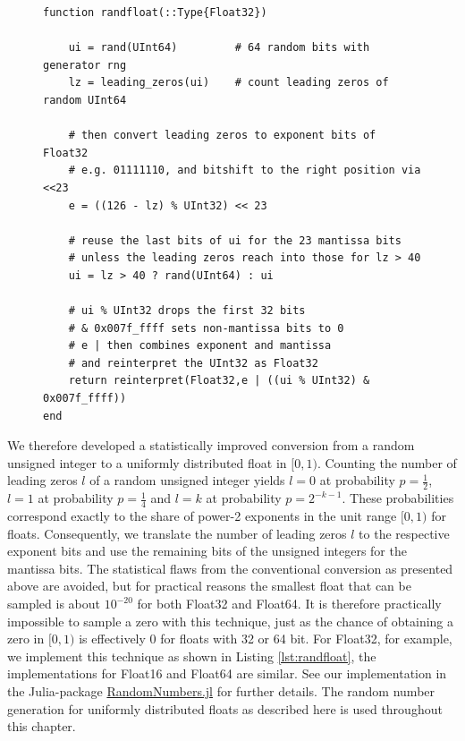 \begin{figure}[tbhp]
\begin{lstlisting}[language=JuliaLocal,label=lst:randfloat,caption={\textbf{An improved random number generator for uniformly
distributed floats.} The Julia function \texttt{randfloat} takes a number format as argument (here only the version for Float32 is presented).
\texttt{\%} is the remainder after division, for unsigned integers effectively converting between unsigned integers by adding leading
zeros or discarding leading bits. \texttt{?} indicates a one-line if-clause. \texttt{\&} is the bitwise logical and-operation. \texttt{$\vert$}
is the bitwise logical or-operation.}]
function randfloat(::Type{Float32})

    ui = rand(UInt64)         # 64 random bits with generator rng
    lz = leading_zeros(ui)    # count leading zeros of random UInt64

    # then convert leading zeros to exponent bits of Float32
    # e.g. 01111110, and bitshift to the right position via <<23
    e = ((126 - lz) % UInt32) << 23

    # reuse the last bits of ui for the 23 mantissa bits
    # unless the leading zeros reach into those for lz > 40
    ui = lz > 40 ? rand(UInt64) : ui

    # ui % UInt32 drops the first 32 bits
    # & 0x007f_ffff sets non-mantissa bits to 0
    # e | then combines exponent and mantissa
    # and reinterpret the UInt32 as Float32
    return reinterpret(Float32,e | ((ui % UInt32) & 0x007f_ffff))
end
\end{lstlisting}
\end{figure}

We therefore developed a statistically improved conversion from a random unsigned integer to a uniformly distributed
float in $[0,1)$. Counting the number of leading zeros $l$ of a random unsigned integer yields $l = 0$ at probability
$p = \tfrac{1}{2}$, $l=1$ at probability $p=\tfrac{1}{4}$ and $l = k$ at probability $p=2^{-k-1}$. These probabilities
correspond exactly to the share of power-2 exponents in the unit range $[0,1)$ for floats.
Consequently, we translate the number of leading zeros $l$  to the respective exponent bits and use the remaining
bits of the unsigned integers for the mantissa bits. The statistical flaws from the conventional conversion as presented
above are avoided, but for practical reasons the smallest float that can be sampled is about $10^{-20}$ for both Float32
and Float64. It is therefore practically impossible to sample a zero with this technique, just as the chance of obtaining a
zero in $[0,1)$ is effectively 0 for floats with 32 or 64 bit. For Float32, for example, we implement this technique as shown
in Listing \ref{lst:randfloat}, the implementations for Float16 and Float64 are similar. See our implementation in the Julia-package
\href{https://github.com/JuliaRandom/RandomNumbers.jl}{RandomNumbers.jl} for further details. The random number generation
for uniformly distributed floats as described here is used throughout this chapter.

